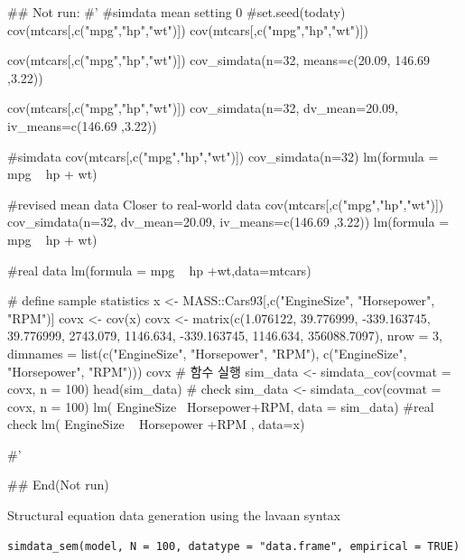 \documentclass[a4paper]{book}
\begin{document}
\begin{Examples}
\begin{ExampleCode}

## Not run: 
#'
#simdata mean setting 0
#set.seed(todaty)
cov(mtcars[,c("mpg","hp","wt")]) %
cov(mtcars[,c("mpg","hp","wt")]) %

cov(mtcars[,c("mpg","hp","wt")]) %
  cov_simdata(n=32, means=c(20.09, 146.69 ,3.22))

cov(mtcars[,c("mpg","hp","wt")]) %
  cov_simdata(n=32, dv_mean=20.09, iv_means=c(146.69 ,3.22))

#simdata
cov(mtcars[,c("mpg","hp","wt")]) %
  cov_simdata(n=32) %
  lm(formula = mpg ~ hp + wt)%

#revised mean data Closer to real-world data
cov(mtcars[,c("mpg","hp","wt")]) %
  cov_simdata(n=32, dv_mean=20.09, iv_means=c(146.69 ,3.22)) %
  lm(formula = mpg ~ hp + wt)%


#real data
lm(formula = mpg ~ hp +wt,data=mtcars)%



# define sample statistics
x <- MASS::Cars93[,c("EngineSize", "Horsepower", "RPM")]
covx <- cov(x)
covx <- matrix(c(1.076122, 39.776999, -339.163745,
                 39.776999, 2743.079, 1146.634,
                 -339.163745, 1146.634, 356088.7097), nrow = 3,
               dimnames = list(c("EngineSize", "Horsepower", "RPM"),
                               c("EngineSize", "Horsepower", "RPM")))
covx
# 함수 실행
sim_data <- simdata_cov(covmat = covx, n = 100)
head(sim_data)
# check
sim_data <- simdata_cov(covmat = covx, n = 100)
lm( EngineSize~ Horsepower+RPM, data = sim_data) %
#real check
lm( EngineSize ~ Horsepower +RPM , data=x)%



#'

## End(Not run)
\end{ExampleCode}
\end{Examples}
%
\begin{Description}
Structural equation data generation using the lavaan syntax
\end{Description}
%
\begin{Usage}
\begin{verbatim}
simdata_sem(model, N = 100, datatype = "data.frame", empirical = TRUE)
\end{verbatim}
\end{Usage}
\end{document}
